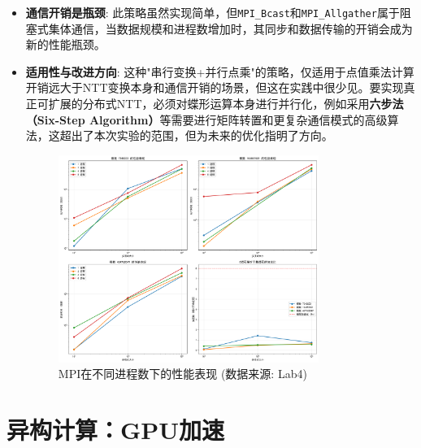 \documentclass[a4paper]{article}
\begin{document}
\begin{itemize}
\begin{itemize}
        \item \textbf{通信开销是瓶颈}: 此策略虽然实现简单，但\texttt{MPI\_Bcast}和\texttt{MPI\_Allgather}属于阻塞式集体通信，当数据规模和进程数增加时，其同步和数据传输的开销会成为新的性能瓶颈。
        \item \textbf{适用性与改进方向}: 这种"串行变换+并行点乘"的策略，仅适用于点值乘法计算开销远大于NTT变换本身和通信开销的场景，但这在实践中很少见。要实现真正可扩展的分布式NTT，必须对蝶形运算本身进行并行化，例如采用\textbf{六步法（Six-Step Algorithm）}等需要进行矩阵转置和更复杂通信模式的高级算法，这超出了本次实验的范围，但为未来的优化指明了方向。
        \begin{figure}[H]
            \centering
            \includegraphics[width=0.8\textwidth]{fig/mpi_performance.png}
            \caption{MPI在不同进程数下的性能表现 (数据来源: Lab4)}
            \label{fig:mpi_perf}
        \end{figure}
    \end{itemize}
\end{itemize}

\section{异构计算：GPU加速}
\end{document}
